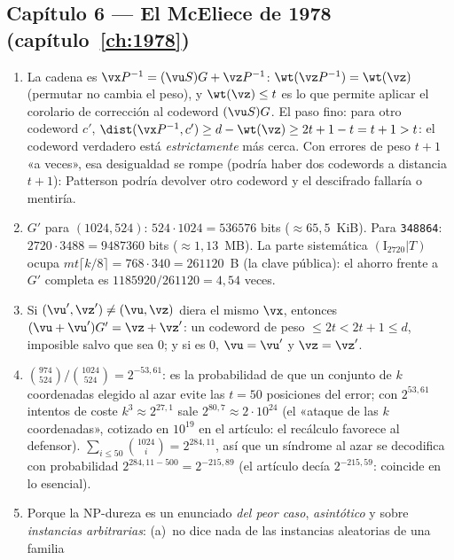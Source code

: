 \subsection*{Capítulo 6 --- El McEliece de 1978
(capítulo~\ref{ch:1978})}

\begin{enumerate}[leftmargin=1.9em,itemsep=4pt]
  \item La cadena es
        $\vx P^{-1}=(\vu S)G+\vz P^{-1}$: $\wt(\vz P^{-1})=\wt(\vz)$
        (permutar no cambia el peso), y $\wt(\vz)\le t$ es lo que
        permite aplicar el corolario de corrección al codeword
        $(\vu S)G$. El paso fino: para otro codeword $c'$,
        $\dist(\vx P^{-1},c')\ge d-\wt(\vz)\ge 2t+1-t=t+1>t$:
        el codeword verdadero está \emph{estrictamente} más cerca.
        Con errores de peso $t+1$ «a veces», esa desigualdad se
        rompe (podría haber dos codewords a distancia $t+1$):
        Patterson podría devolver otro codeword y el descifrado
        fallaría o mentiría.
  \item $G'$ para $(1024,524)$: $524\cdot1024=\num{536576}$ bits
        ($\approx65{,}5$~KiB). Para \texttt{348864}:
        $2720\cdot3488=\num{9487360}$ bits
        ($\approx1{,}13$~MB). La parte sistemática
        $(\mathrm{I}_{2720}|T)$ ocupa $mt\lceil k/8\rceil
        =768\cdot340=\num{261120}$~B (la clave pública): el ahorro
        frente a $G'$ completa es $1185920/261120=4{,}54$ veces.
  \item Si $(\vu',\vz')\ne(\vu,\vz)$ diera el mismo $\vx$, entonces
        $(\vu+\vu')G'=\vz+\vz'$: un codeword de peso
        $\le2t<2t+1\le d$, imposible salvo que sea $0$; y si es
        $0$, $\vu=\vu'$ y $\vz=\vz'$.
  \item $\binom{974}{524}/\binom{1024}{524}=2^{-53{,}61}$: es la
        probabilidad de que un conjunto de $k$ coordenadas elegido al
        azar evite las $t=50$ posiciones del error; con
        $2^{53{,}61}$ intentos de coste $k^3\approx2^{27{,}1}$ sale
        $2^{80{,}7}\approx2\cdot10^{24}$ (el «ataque de las $k$
        coordenadas», cotizado en $10^{19}$ en el artículo: el
        recálculo favorece al defensor). $\sum_{i\le50}\binom{1024}{i}
        =2^{284{,}11}$, así que un síndrome al azar se decodifica con
        probabilidad $2^{284{,}11-500}=2^{-215{,}89}$ (el artículo
        decía $2^{-215{,}59}$: coincide en lo esencial).
  \item Porque la NP-dureza es un enunciado \emph{del peor caso},
        \emph{asintótico} y sobre \emph{instancias arbitrarias}:
        (a)~no dice nada de las instancias aleatorias de una familia

\end{enumerate}
